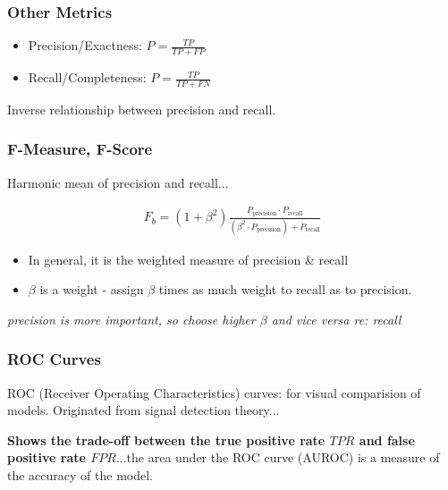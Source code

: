 \documentclass{article}
\begin{document}
\subsubsection{Other Metrics}
\begin{itemize}
	\item Precision/Exactness: $P = \frac{TP}{TP + FP}$
	\item Recall/Completeness: $P = \frac{TP}{TP + FN}$
\end{itemize}

Inverse relationship between precision and recall.

\subsubsection{F-Measure, F-Score}
Harmonic mean of precision and recall...

\begin{align*}
	F_{b} = (1 + \beta^2) \frac{P_{\text{precision}} \cdot P_{\text{recall}}}{(\beta^2 \cdot P_{\text{precision}}) + P_{\text{recall}}}
\end{align*}

\begin{itemize}
	\item In general, it is the weighted measure of precision \& recall
	\item $\beta$ is a weight - assign $\beta$ times as much weight to recall as to precision.
\end{itemize}

{\em precision is more important, so choose higher $\beta$ and vice versa re: recall}

\subsubsection{ROC Curves}
ROC (Receiver Operating Characteristics) curves: for visual comparision of models. Originated from signal detection theory...

{\bf Shows the trade-off between the true positive rate $TPR$ and false positive rate $FPR$}...the area under the ROC curve (AUROC) is a measure of the accuracy of the model.
\end{document}
